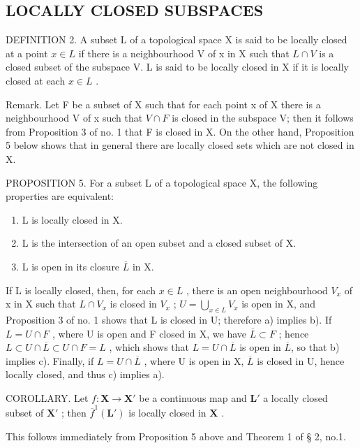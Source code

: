 \subsection{LOCALLY CLOSED SUBSPACES}

DEFINITION 2. A subset L of a topological space X is said to be locally closed at a point \(x \in L\) if there is a neighbourhood V of x in X such that \(L \cap V\) is a closed subset of the subspace V. L is said to be locally closed in X if it is locally closed at each \(x \in L\) .

Remark. Let F be a subset of X such that for each point x of X there is a neighbourhood V of x such that \(V \cap F\) is closed in the subspace V; then it follows from Proposition 3 of no. 1 that F is closed in X. On the other hand, Proposition 5 below shows that in general there are locally closed sets which are not closed in X.

PROPOSITION 5. For a subset L of a topological space X, the following properties are equivalent:

\begin{enumerate}
\def\labelenumi{\alph{enumi})}
\item
  L is locally closed in X.
\item
  L is the intersection of an open subset and a closed subset of X.
\item
  L is open in its closure \(\overline{L}\) in X.
\end{enumerate}

If L is locally closed, then, for each \(x \in L\) , there is an open neighbourhood \(V_{x}\) of x in X such that \(L \cap V_{x}\) is closed in \(V_{x}\) ; \(U = \bigcup_{x \in L} V_{x}\) is open in X, and Proposition 3 of no. 1 shows that L is closed in U; therefore a) implies b). If \(L = U \cap F\) , where U is open and F closed in X, we have \(\overline{L} \subset F\) ; hence \(L \subset U \cap \overline{L} \subset U \cap F = L\) , which shows that \(L = U \cap \overline{L}\) is open in \(\overline{L}\), so that b) implies c). Finally, if \(L = U \cap \overline{L}\) , where U is open in X, \(\overline{L}\) is closed in U, hence locally closed, and thus c) implies a).

COROLLARY. Let \(f: \mathbf{X} \to \mathbf{X}'\) be a continuous map and \(\mathbf{L}'\) a locally closed subset of \(\mathbf{X}'\) ; then \(\overline{f}^{1}(\mathbf{L}')\) is locally closed in \(\mathbf{X}\) .

This follows immediately from Proposition 5 above and Theorem 1 of § 2, no.1.

